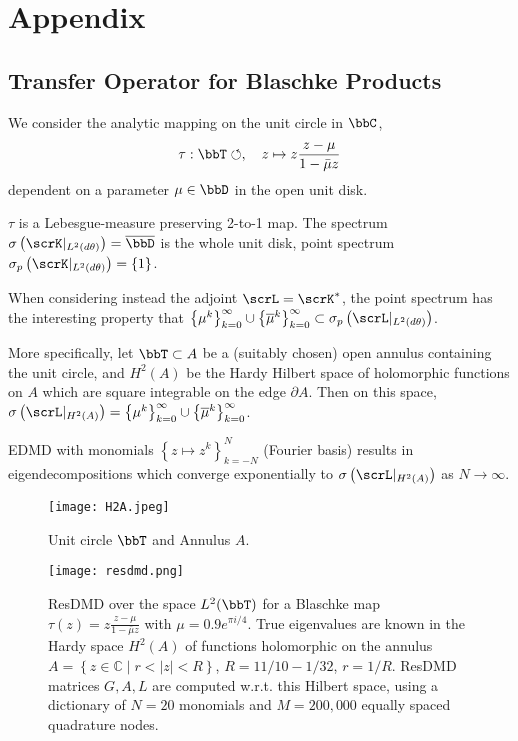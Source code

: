 
\section{Appendix}


\subsection{Transfer Operator for Blaschke Products}

We consider the analytic mapping on the unit circle in $\bbC$, 
\begin{equation*}
    \tau : \bbT \circlearrowleft, \quad z \mapsto z \frac{z - \mu}{1 - \bar{\mu} z} 
\end{equation*}
dependent on a parameter $\mu \in \bbD$ in the open unit disk. 

$\tau$ is a Lebesgue-measure preserving 2-to-1 map. The spectrum 
$\sigma \left( \scrK \vert_{L^2 (d\theta)} \right) = \overline{\bbD}$ is the whole unit 
disk, point spectrum 
$\sigma_p \left( \scrK \vert_{L^2 (d\theta)} \right) = \left\{ 1 \right\}$. 

When considering instead the adjoint $\scrL = \scrK^*$, the point spectrum has the 
interesting property that 
$\left\{ \mu^k \right\}_{k=0}^\infty \cup \left\{ \overline{\mu}^k \right\}_{k=0}^\infty \subset \sigma_p \left( \scrL \vert_{L^2 (d\theta)} \right)$. 

More specifically, let $\bbT \subset A$ be a (suitably chosen) open annulus containing the 
unit circle, and $H^2 (A)$ be the Hardy Hilbert space of holomorphic functions on $A$ which 
are square integrable on the edge $\partial A$. Then on this space, 
$\sigma \left( \scrL \vert_{H^2 (A)} \right) = \left\{ \mu^k \right\}_{k=0}^\infty \cup \left\{ \overline{\mu}^k \right\}_{k=0}^\infty$. 

EDMD with monomials $\left\{ z \mapsto z^k \right\}_{k=-N}^N$ (Fourier basis) results in 
eigendecompositions which converge exponentially to 
$\sigma \left( \scrL \vert_{H^2 (A)} \right)$ as $N \to \infty$. 


\begin{figure}
    \texttt{[image: H2A.jpeg]}
    \caption{
        Unit circle $\bbT$ and Annulus $A$. 
    }
\end{figure}

\begin{figure}
    \texttt{[image: resdmd.png]}
    \caption{
        ResDMD over the space $L^2(\bbT)$ for a Blaschke map 
        $\tau (z) = z \frac{z - \mu}{1 - \bar{\mu} z}$ with $\mu = 0.9 e^{\pi i / 4}$. 
        True eigenvalues are known in the Hardy space $H^2 (A)$ of functions holomorphic on 
        the annulus 
        $A = \left\{ z \in \mathbb{C} \mid r < |z| < R \right\}$, 
        $R = 11/10 - 1/32$, $r = 1/R$. ResDMD matrices $G, A, L$ are computed w.r.t. this   
        Hilbert space, using a dictionary of $N = 20$ monomials and $M = 200,000$
        equally spaced quadrature nodes. 
    }
    \label{fig:resdmd}
\end{figure}

